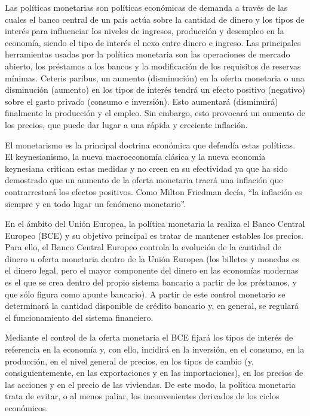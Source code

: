 \documentclass[
]{krantz}
\begin{document}
Las políticas monetarias son políticas económicas de demanda a través de las cuales el banco central de un país actúa sobre la cantidad de dinero y los tipos de interés para influenciar los niveles de ingresos, producción y desempleo en la economía, siendo el tipo de interés el nexo entre dinero e ingreso. Las principales herramientas usadas por la política monetaria son las operaciones de mercado abierto, los préstamos a los bancos y la modificación de los requisitos de reservas mínimas. Ceteris paribus, un aumento (disminución) en la oferta monetaria o una disminución (aumento) en los tipos de interés tendrá un efecto positivo (negativo) sobre el gasto privado (consumo e inversión). Esto aumentará (disminuirá) finalmente la producción y el empleo. Sin embargo, esto provocará un aumento de los precios, que puede dar lugar a una rápida y creciente inflación.

El monetarismo es la principal doctrina económica que defendía estas políticas. El keynesianismo, la nueva macroeconomía clásica y la nueva economía keynesiana critican estas medidas y no creen en su efectividad ya que ha sido demostrado que un aumento de la oferta monetaria traerá una inflación que contrarrestará los efectos positivos. Como Milton Friedman decía, ``la inflación es siempre y en todo lugar un fenómeno monetario''.

En el ámbito del Unión Europea, la política monetaria la realiza el Banco Central Europeo (BCE) y su objetivo principal es tratar de mantener estables los precios. Para ello, el Banco Central Europeo controla la evolución de la cantidad de dinero u oferta monetaria dentro de la Unión Europea (los billetes y monedas es el dinero legal, pero el mayor componente del dinero en las economías modernas es el que se crea dentro del propio sistema bancario a partir de los préstamos, y que sólo figura como apunte bancario). A partir de este control monetario se determinará la cantidad disponible de crédito bancario y, en general, se regulará el funcionamiento del sistema financiero.

Mediante el control de la oferta monetaria el BCE fijará los tipos de interés de referencia en la economía y, con ello, incidirá en la inversión, en el consumo, en la producción, en el nivel general de precios, en los tipos de cambio (y, consiguientemente, en las exportaciones y en las importaciones), en los precios de las acciones y en el precio de las viviendas. De este modo, la política monetaria trata de evitar, o al menos paliar, los inconvenientes derivados de los ciclos económicos.
\end{document}
